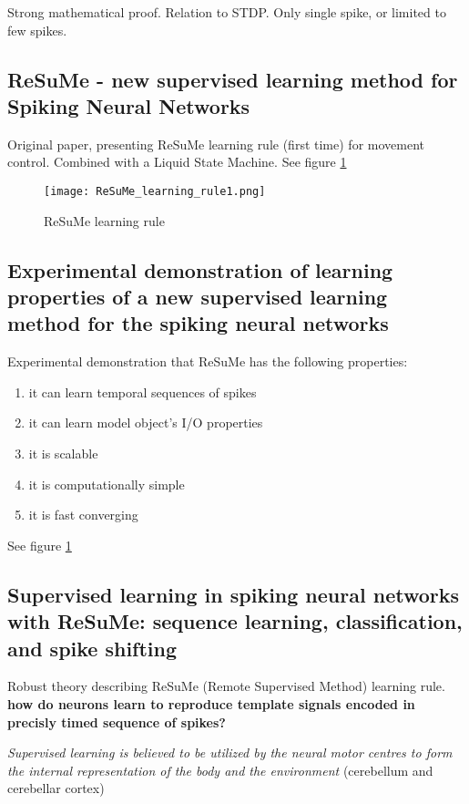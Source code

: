 \documentclass[12pt]{article}
\begin{document}
Strong mathematical proof. Relation to STDP. Only single spike, or limited to few spikes.

\subsection{ReSuMe - new supervised learning method for Spiking Neural Networks \cite{ponulak2005resume}}
Original paper, presenting ReSuMe learning rule (first time) for movement control. Combined with a Liquid State Machine. See figure \ref{ReSuMe1}

\begin{figure}
\center
\texttt{[image: ReSuMe\_learning\_rule1.png]}
\caption{ReSuMe learning rule}
\label{ReSuMe1}
\end{figure}

\subsection{Experimental demonstration of learning properties of a new supervised learning method for the spiking neural networks \cite{kasinski2005experimental}}

Experimental demonstration that ReSuMe has the following properties: \begin{enumerate}
\item it can learn temporal sequences of spikes
\item it can learn model object's I/O properties
\item it is scalable
\item it is computationally simple
\item it is fast converging
\end{enumerate}

See figure \ref{ReSuMe1}

\subsection{Supervised learning in spiking neural networks with ReSuMe: sequence learning, classification, and spike shifting \cite{ponulak2010supervised}}

Robust theory describing ReSuMe (Remote Supervised Method) learning rule.
\textbf{how do neurons learn to reproduce template signals encoded in precisly timed sequence of spikes?}

\textit{Supervised learning is believed to be utilized by the neural motor centres to form the internal representation of the body and the environment} (cerebellum and cerebellar cortex)
\end{document}
